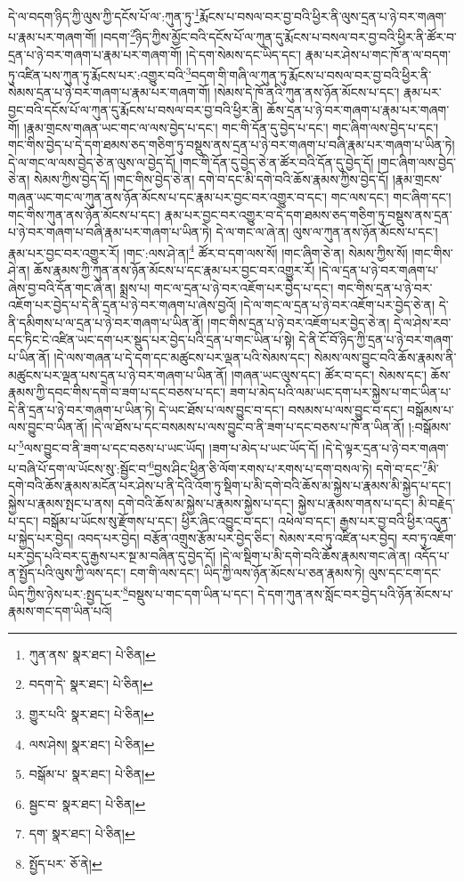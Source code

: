 དེ་ལ་བདག་ཉིད་ཀྱི་ལུས་ཀྱི་དངོས་པོ་ལ་:ཀུན་ཏུ་\footnote{ཀུན་ནས་  སྣར་ཐང་།  པེ་ཅིན། }རྨོངས་པ་བསལ་བར་བྱ་བའི་ཕྱིར་ནི་ལུས་དྲན་པ་ཉེ་བར་གཞག་པ་རྣམ་པར་གཞག་གོ། །བདག་\footnote{བདག་དེ་  སྣར་ཐང་།  པེ་ཅིན། }ཉིད་ཀྱིས་མྱོང་བའི་དངོས་པོ་ལ་ཀུན་དུ་རྨོངས་པ་བསལ་བར་བྱ་བའི་ཕྱིར་ནི་ཚོར་བ་དྲན་པ་ཉེ་བར་གཞག་པ་རྣམ་པར་གཞག་གོ། །དེ་དག་སེམས་དང་ཡིད་དང་། རྣམ་པར་ཤེས་པ་གང་ཁོ་ན་ལ་བདག་ཏུ་འཛིན་པས་ཀུན་ཏུ་རྨོངས་པར་:འགྱུར་བའི་\footnote{གྱུར་པའི་  སྣར་ཐང་།  པེ་ཅིན། }བདག་གི་གཞི་ལ་ཀུན་ཏུ་རྨོངས་པ་བསལ་བར་བྱ་བའི་ཕྱིར་ནི་སེམས་དྲན་པ་ཉེ་བར་གཞག་པ་རྣམ་པར་གཞག་གོ། །སེམས་དེ་ཁོ་ནའི་ཀུན་ནས་ཉོན་མོངས་པ་དང་། རྣམ་པར་བྱང་བའི་དངོས་པོ་ལ་ཀུན་དུ་རྨོངས་པ་བསལ་བར་བྱ་བའི་ཕྱིར་ནི། ཆོས་དྲན་པ་ཉེ་བར་གཞག་པ་རྣམ་པར་གཞག་གོ། །རྣམ་གྲངས་གཞན་ཡང་གང་ལ་ལས་བྱེད་པ་དང་། གང་གི་དོན་དུ་བྱེད་པ་དང་། གང་ཞིག་ལས་བྱེད་པ་དང་། གང་གིས་བྱེད་པ་དེ་དག་ཐམས་ཅད་གཅིག་ཏུ་བསྡུས་ནས་དྲན་པ་ཉེ་བར་གཞག་པ་བཞི་རྣམ་པར་གཞག་པ་ཡིན་ཏེ། དེ་ལ་གང་ལ་ལས་བྱེད་ཅེ་ན་ལུས་ལ་བྱེད་དོ། །གང་གི་དོན་དུ་བྱེད་ཅེ་ན་ཚོར་བའི་དོན་དུ་བྱེད་དོ། །གང་ཞིག་ལས་བྱེད་ཅེ་ན། སེམས་ཀྱིས་བྱེད་དོ། །གང་གིས་བྱེད་ཅེ་ན། དགེ་བ་དང་མི་དགེ་བའི་ཆོས་རྣམས་ཀྱིས་བྱེད་དོ། །རྣམ་གྲངས་གཞན་ཡང་གང་ལ་ཀུན་ནས་ཉོན་མོངས་པ་དང་རྣམ་པར་བྱང་བར་འགྱུར་བ་དང་། གང་ལས་དང་། གང་ཞིག་དང་། གང་གིས་ཀུན་ནས་ཉོན་མོངས་པ་དང་། རྣམ་པར་བྱང་བར་འགྱུར་བ་དེ་དག་ཐམས་ཅད་གཅིག་ཏུ་བསྡུས་ནས་དྲན་པ་ཉེ་བར་གཞག་པ་བཞི་རྣམ་པར་གཞག་པ་ཡིན་ཏེ། དེ་ལ་གང་ལ་ཞེ་ན། ལུས་ལ་ཀུན་ནས་ཉོན་མོངས་པ་དང་། རྣམ་པར་བྱང་བར་འགྱུར་རོ། །གང་:ལས་ཤེ་ན།\footnote{ལས་ཤེས།  སྣར་ཐང་།  པེ་ཅིན། } ཚོར་བ་དག་ལས་སོ། །གང་ཞིག་ཅེ་ན། སེམས་ཀྱིས་སོ། །གང་གིས་ཤེ་ན། ཆོས་རྣམས་ཀྱི་ཀུན་ནས་ཉོན་མོངས་པ་དང་རྣམ་པར་བྱང་བར་འགྱུར་རོ། །དེ་ལ་དྲན་པ་ཉེ་བར་གཞག་པ་ཞེས་བྱ་བའི་དོན་གང་ཞེ་ན། སྨྲས་པ། གང་ལ་དྲན་པ་ཉེ་བར་འཇོག་པར་བྱེད་པ་དང་། གང་གིས་དྲན་པ་ཉེ་བར་འཇོག་པར་བྱེད་པ་དེ་ནི་དྲན་པ་ཉེ་བར་གཞག་པ་ཞེས་བྱའོ། །དེ་ལ་གང་ལ་དྲན་པ་ཉེ་བར་འཇོག་པར་བྱེད་ཅེ་ན། དེ་ནི་དམིགས་པ་ལ་དྲན་པ་ཉེ་བར་གཞག་པ་ཡིན་ནོ། །གང་གིས་དྲན་པ་ཉེ་བར་འཇོག་པར་བྱེད་ཅེ་ན། དེ་ལ་ཤེས་རབ་དང་ཏིང་ངེ་འཛིན་ཡང་དག་པར་སྡུད་པར་བྱེད་པའི་དྲན་པ་གང་ཡིན་པ་སྟེ། དེ་ནི་ངོ་བོ་ཉིད་ཀྱི་དྲན་པ་ཉེ་བར་གཞག་པ་ཡིན་ནོ། །དེ་ལས་གཞན་པ་དེ་དག་དང་མཚུངས་པར་ལྡན་པའི་སེམས་དང་། སེམས་ལས་བྱུང་བའི་ཆོས་རྣམས་ནི་མཚུངས་པར་ལྡན་པས་དྲན་པ་ཉེ་བར་གཞག་པ་ཡིན་ནོ། །གཞན་ཡང་ལུས་དང་། ཚོར་བ་དང་། སེམས་དང་། ཆོས་རྣམས་ཀྱི་དབང་གིས་དགེ་བ་ཟག་པ་དང་བཅས་པ་དང་། ཟག་པ་མེད་པའི་ལམ་ཡང་དག་པར་སྐྱེས་པ་གང་ཡིན་པ་དེ་ནི་དྲན་པ་ཉེ་བར་གཞག་པ་ཡིན་ཏེ། དེ་ཡང་ཐོས་པ་ལས་བྱུང་བ་དང་། བསམས་པ་ལས་བྱུང་བ་དང་། བསྒོམས་པ་ལས་བྱུང་བ་ཡིན་ནོ། །དེ་ལ་ཐོས་པ་དང་བསམས་པ་ལས་བྱུང་བ་ནི་ཟག་པ་དང་བཅས་པ་ཁོ་ན་ཡིན་ནོ། །:བསྒོམས་པ་\footnote{བསྒོམ་པ་  སྣར་ཐང་།  པེ་ཅིན། }ལས་བྱུང་བ་ནི་ཟག་པ་དང་བཅས་པ་ཡང་ཡོད། །ཟག་པ་མེད་པ་ཡང་ཡོད་དོ། །དེ་དེ་ལྟར་དྲན་པ་ཉེ་བར་གཞག་པ་བཞི་པོ་དག་ལ་ཡོངས་སུ་:སྦྱོང་བ་\footnote{སྦྱང་བ་  སྣར་ཐང་།  པེ་ཅིན། }བྱས་ཤིང་ཕྱིན་ཅི་ལོག་རགས་པ་རགས་པ་དག་བསལ་ཏེ། དགེ་བ་དང་\footnote{དག་  སྣར་ཐང་།  པེ་ཅིན། }མི་དགེ་བའི་ཆོས་རྣམས་མངོན་པར་ཤེས་པ་ནི་དེའི་འོག་ཏུ་སྡིག་པ་མི་དགེ་བའི་ཆོས་མ་སྐྱེས་པ་རྣམས་མི་སྐྱེད་པ་དང་། སྐྱེས་པ་རྣམས་སྤང་པ་ནས། དགེ་བའི་ཆོས་མ་སྐྱེས་པ་རྣམས་སྐྱེས་པ་དང་། སྐྱེས་པ་རྣམས་གནས་པ་དང་། མི་བརྗེད་པ་དང་། བསྒོམ་པ་ཡོངས་སུ་རྫོགས་པ་དང་། ཕྱིར་ཞིང་འབྱུང་བ་དང་། འཕེལ་བ་དང་། རྒྱས་པར་བྱ་བའི་ཕྱིར་འདུན་པ་སྐྱེད་པར་བྱེད། འབད་པར་བྱེད། བརྩོན་འགྲུས་རྩོམ་པར་བྱེད་ཅིང་། སེམས་རབ་ཏུ་འཛིན་པར་བྱེད། རབ་ཏུ་འཇོག་པར་བྱེད་པའི་བར་དུ་རྒྱས་པར་སྔ་མ་བཞིན་དུ་བྱེད་དོ། །དེ་ལ་སྡིག་པ་མི་དགེ་བའི་ཆོས་རྣམས་གང་ཞེ་ན། འདོད་པ་ན་སྤྱོད་པའི་ལུས་ཀྱི་ལས་དང་། ངག་གི་ལས་དང་། ཡིད་ཀྱི་ལས་ཉོན་མོངས་པ་ཅན་རྣམས་ཏེ། ལུས་དང་ངག་དང་ཡིད་ཀྱིས་ཉེས་པར་:སྤྱད་པར་\footnote{སྤྱོད་པར་  ཅོ་ནེ། }བསྡུས་པ་གང་དག་ཡིན་པ་དང་། དེ་དག་ཀུན་ནས་སློང་བར་བྱེད་པའི་ཉོན་མོངས་པ་རྣམས་གང་དག་ཡིན་པའོ། 